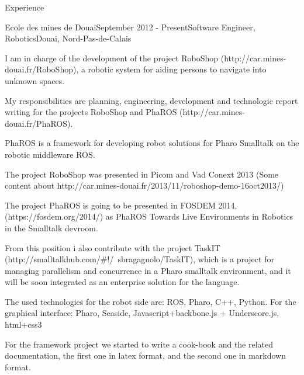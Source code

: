 \documentclass{resume} %
\begin{document}
\begin{rSection}{Experience}

\begin{rSubsection}{Ecole des mines de Douai}{September 2012 - Present}{Software Engineer, Robotics}{Douai, Nord-Pas-de-Calais}
\item I am in charge of the development of the project RoboShop (http://car.mines-douai.fr/RoboShop), a robotic system for aiding persons to navigate into unknown spaces. 
\item My responsibilities are planning, engineering, development and technologic report writing for the projects RoboShop and PhaROS (http://car.mines-douai.fr/PhaROS). 
\item PhaROS is a framework for developing robot solutions for Pharo Smalltalk on the robotic middleware ROS. 
\item The project RoboShop was presented in Picom and Vad Conext 2013 (Some content about http://car.mines-douai.fr/2013/11/roboshop-demo-16oct2013/) 
\item The project PhaROS is going to be presented in FOSDEM 2014, (https://fosdem.org/2014/) as PhaROS Towards Live Environments in Robotics in the Smalltalk devroom.
\item From this position i also contribute with the project TaskIT (http://smalltalkhub.com/\#!/~sbragagnolo/TaskIT), which is a project for managing parallelism and concurrence in a Pharo smalltalk environment, and it will be soon integrated as an enterprise solution for the language.
\item The used technologies for the robot side are: ROS, Pharo, C++, Python. For the graphical interface: Pharo, Seaside, Javascript+backbone.js + Underscore.js, html+css3
\item For the framework project we started to write a cook-book and the related documentation, the first one in latex format, and the second one in markdown format.
\end{rSubsection}




\end{rSection}
\end{document}
